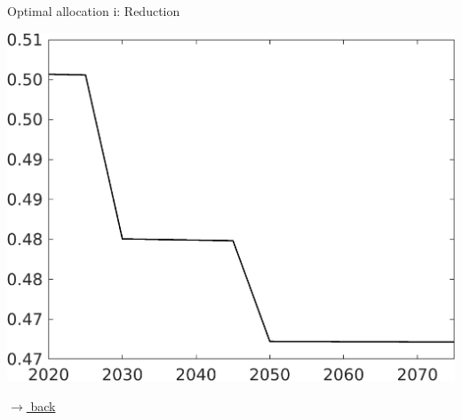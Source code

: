 \documentclass[11pt,aspectratio=169]{beamer}
\begin{document}
\begin{frame}{Optimal allocation i: Reduction}
\begin{minipage}[]{0.32\textwidth}
	\end{minipage}
	\begin{minipage}[]{0.32\textwidth}
		\includegraphics[width=1\textwidth]{../codding_model/own_basedOnFried/optimalPol_elastS_DisuSci/figures/all_1705/Single_OPT_T_NoTaus_EY_spillover0_sep1_BN1_ineq0_red0_etaa0.79.png}
	\end{minipage}
	
	\vspace{-2mm}
	\hfill
	\hyperlink{benf}{\tiny{$\rightarrow$ back}} 
\end{frame}
\end{document}
